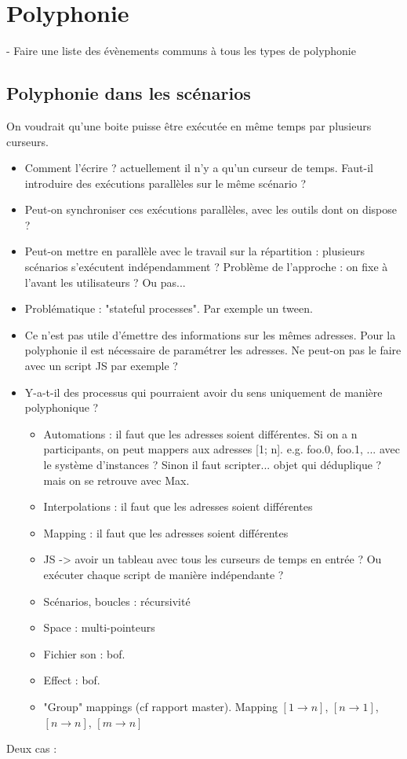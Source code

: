 \documentclass[french,a4paper,openany,12pt]{book}
\begin{document}
\section{Polyphonie}
- Faire une liste des évènements communs à tous les types de polyphonie
\subsection{Polyphonie dans les scénarios}
On voudrait qu'une boite puisse être exécutée en même temps par plusieurs curseurs.
\begin{itemize}
	\item Comment l'écrire ? actuellement il n'y a qu'un curseur de temps. Faut-il introduire des exécutions parallèles sur le même scénario ?
	\item Peut-on synchroniser ces exécutions parallèles, avec les outils dont on dispose ? 
	\item Peut-on mettre en parallèle avec le travail sur la répartition : plusieurs scénarios s'exécutent indépendamment ? Problème de l'approche : on fixe à l'avant les utilisateurs ? Ou pas...
	\item Problématique : "stateful processes". Par exemple un tween. 
	\item Ce n'est pas utile d'émettre des informations sur les mêmes adresses. Pour la polyphonie il est nécessaire de paramétrer les adresses. Ne peut-on pas le faire avec un script JS par exemple ?
	\item Y-a-t-il des processus qui pourraient avoir du sens uniquement de manière polyphonique ? 
	\begin{itemize}
		\item Automations : il faut que les adresses soient différentes. Si on a n participants, on peut mappers aux adresses [1; n]. e.g. foo.0, foo.1, ... avec le système d'instances ?  Sinon il faut scripter... objet qui déduplique ? mais on se retrouve avec Max.
		\item Interpolations : il faut que les adresses soient différentes
		\item Mapping : il faut que les adresses soient différentes
		\item JS -> avoir un tableau avec tous les curseurs de temps en entrée ? Ou exécuter chaque script de manière indépendante ?
		\item Scénarios, boucles : récursivité
		\item Space : multi-pointeurs
		\item Fichier son : bof.
		\item Effect : bof.
		\item "Group" mappings (cf rapport master). Mapping $[1 \rightarrow n]$, $[n \rightarrow 1]$, $[n \rightarrow n]$, $[m \rightarrow n]$
	\end{itemize}
\end{itemize}
Deux cas : 
\end{document}
